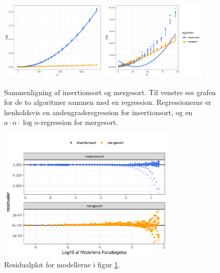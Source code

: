 \begin{figure} \centering
	\includegraphics[width=0.45\textwidth]{../img/toAlgoritmer.png}
	\includegraphics[width=0.45\textwidth]{../img/toAlgoritmerZoomed}
	\caption{Sammenligning af insertionsort og mergesort. Til venstre ses grafen for de to algoritmer sammen med en regression. Regressionerne er henholdsvis en andengradsregression for insertionsort, og en $a \cdot n \cdot \log n$-regression for mergesort.}
	\label{fig:plot - to algoritmer}
\end{figure}

\begin{figure}
	\begin{center}
		\includegraphics[width=0.75\textwidth]{../img/toAlgoritmerResidual.png}
	\end{center}
	\caption{Residualplot for modellerne i figur \ref{fig:plot - to algoritmer}.}
	\label{fig:toAlgoritmerResidual}
\end{figure}



